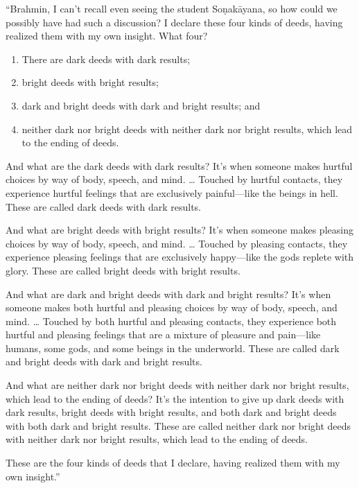 \documentclass[12pt,openany]{book}%
\begin{document}
“Brahmin, I can’t recall even seeing the student \textsanskrit{Soṇakāyana}, so how could we possibly have had such a discussion? I declare these four kinds of deeds, having realized them with my own insight. What four? 

\begin{enumerate}%
\item There are dark deeds with dark results; %
\item bright deeds with bright results; %
\item dark and bright deeds with dark and bright results; and %
\item neither dark nor bright deeds with neither dark nor bright results, which lead to the ending of deeds. %
\end{enumerate}

And what are the dark deeds with dark results? It’s when someone makes hurtful choices by way of body, speech, and mind. … Touched by hurtful contacts, they experience hurtful feelings that are exclusively painful—like the beings in hell. These are called dark deeds with dark results. 

And what are bright deeds with bright results? It’s when someone makes pleasing choices by way of body, speech, and mind. … Touched by pleasing contacts, they experience pleasing feelings that are exclusively happy—like the gods replete with glory. These are called bright deeds with bright results. 

And what are dark and bright deeds with dark and bright results? It’s when someone makes both hurtful and pleasing choices by way of body, speech, and mind. … Touched by both hurtful and pleasing contacts, they experience both hurtful and pleasing feelings that are a mixture of pleasure and pain—like humans, some gods, and some beings in the underworld. These are called dark and bright deeds with dark and bright results. 

And what are neither dark nor bright deeds with neither dark nor bright results, which lead to the ending of deeds? It’s the intention to give up dark deeds with dark results, bright deeds with bright results, and both dark and bright deeds with both dark and bright results. These are called neither dark nor bright deeds with neither dark nor bright results, which lead to the ending of deeds. 

These are the four kinds of deeds that I declare, having realized them with my own insight.” 
\end{document}

